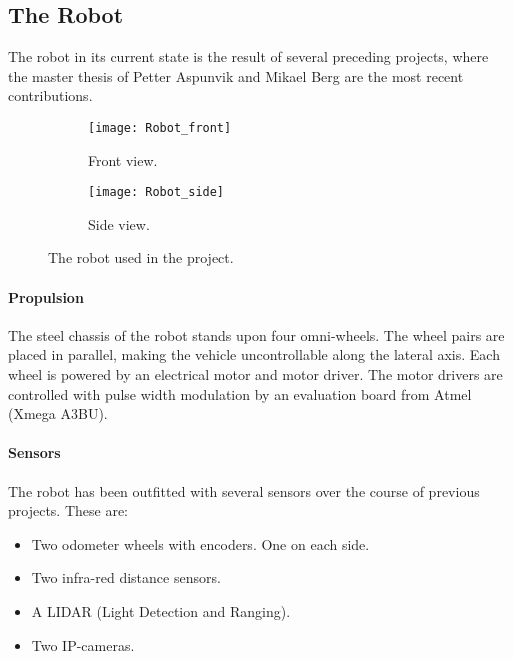 \subsection{The Robot} 

The robot in its current state is the result of several preceding projects, where the master thesis of Petter Aspunvik \cite{aspunvik} and Mikael Berg \cite{berg} are the most recent contributions. 

\begin{figure}
\centering
 \begin{subfigure}[b]{0.3\textwidth}
        \texttt{[image: Robot\_front]}
        \caption{Front view.}
        \label{fig:RobotFront}
    \end{subfigure}
    \begin{subfigure}[b]{0.65\textwidth}
        \texttt{[image: Robot\_side]}
        \caption{Side view.}
        \label{fig:RobotSide}
    \end{subfigure}
    \caption{\label{fig:RobotView}The robot used in the project.}
\end{figure}

\paragraph{Propulsion}

The steel chassis of the robot stands upon four omni-wheels. The wheel pairs are placed in parallel, making the vehicle uncontrollable along the lateral axis. Each wheel is powered by an electrical motor and motor driver. The motor drivers are controlled with pulse width modulation by an evaluation board from Atmel (Xmega A3BU).  

\paragraph{Sensors}

The robot has been outfitted with several sensors over the course of previous projects. These are:
\begin{itemize}
	\item Two odometer wheels with encoders. One on each side. 
	\item Two infra-red distance sensors. 
	\item A LIDAR (Light Detection and Ranging).
	\item Two IP-cameras.
\end{itemize} 

